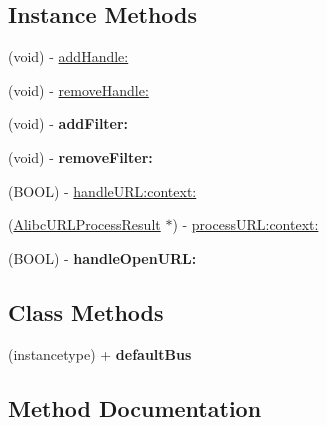 \subsection*{Instance Methods}
\begin{DoxyCompactItemize}
\item 
(void) -\/ \mbox{\hyperlink{interface_alibc_u_r_l_bus_a4f31e98b0fcd2cf4292cc2a54841f6a1}{add\+Handle\+:}}
\item 
(void) -\/ \mbox{\hyperlink{interface_alibc_u_r_l_bus_af4a35e8c5e4fbcef5b08ecd19620ac27}{remove\+Handle\+:}}
\item 
\mbox{\label{interface_alibc_u_r_l_bus_a63b0a6851192ae76939c420466f976e3}} 
(void) -\/ {\bfseries add\+Filter\+:}
\item 
\mbox{\label{interface_alibc_u_r_l_bus_a5d4b14b0de14c3897f31545fb8c27ed8}} 
(void) -\/ {\bfseries remove\+Filter\+:}
\item 
(B\+O\+OL) -\/ \mbox{\hyperlink{interface_alibc_u_r_l_bus_a899cf42bb842558727058ff261e68cfd}{handle\+U\+R\+L\+:context\+:}}
\item 
(\mbox{\hyperlink{interface_alibc_u_r_l_process_result}{Alibc\+U\+R\+L\+Process\+Result}} $\ast$) -\/ \mbox{\hyperlink{interface_alibc_u_r_l_bus_aec652f94f7ac2556efd091669ae76298}{process\+U\+R\+L\+:context\+:}}
\item 
\mbox{\label{interface_alibc_u_r_l_bus_a7f5b59977ee11127e380512f6cb991c0}} 
(B\+O\+OL) -\/ {\bfseries handle\+Open\+U\+R\+L\+:}
\end{DoxyCompactItemize}
\subsection*{Class Methods}
\begin{DoxyCompactItemize}
\item 
\mbox{\label{interface_alibc_u_r_l_bus_ae5f5a412f04cbefca2636513c81e2b2c}} 
(instancetype) + {\bfseries default\+Bus}
\end{DoxyCompactItemize}


\subsection{Method Documentation}
\mbox{\label{interface_alibc_u_r_l_bus_a4f31e98b0fcd2cf4292cc2a54841f6a1}} 
